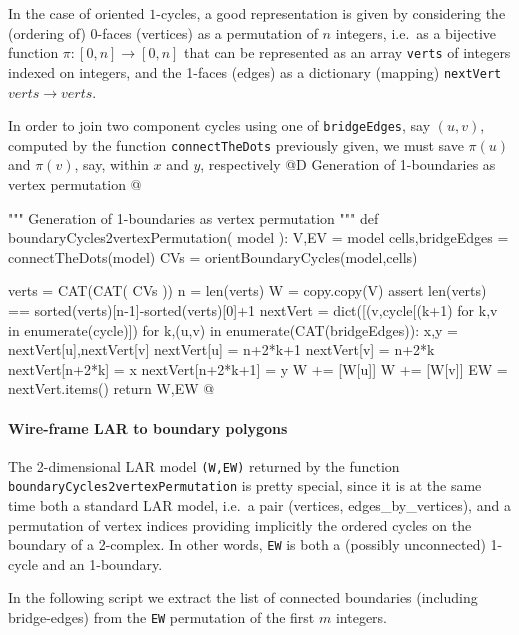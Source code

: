 \documentclass[11pt,oneside]{article}    %
\begin{document}
In the case of oriented $1$-cycles, a good representation is given by considering the (ordering of) 0-faces (vertices) as a permutation of $n$ integers, i.e.~as a bijective function $\pi :[0,n]\to[0,n]$ that can be represented as an array \texttt{verts} of integers indexed on integers, and the 1-faces (edges) as a dictionary (mapping) \texttt{nextVert} $verts\to verts$.

In order to join two component cycles using one of \texttt{bridgeEdges}, say $(u,v)$, computed by the function \texttt{connectTheDots} previously given, we must save $\pi(u)$ and $\pi(v)$, say, within $x$ and $y$, respectively
@D Generation of 1-boundaries as vertex permutation 
@{""" Generation of 1-boundaries as vertex permutation """
def boundaryCycles2vertexPermutation( model ):
    V,EV = model
    cells,bridgeEdges = connectTheDots(model)
    CVs = orientBoundaryCycles(model,cells)
    
    verts = CAT(CAT( CVs ))
    n = len(verts)
    W = copy.copy(V)
    assert len(verts) == sorted(verts)[n-1]-sorted(verts)[0]+1
    nextVert = dict([(v,cycle[(k+1)%
                   for k,v in enumerate(cycle)])
    for k,(u,v) in enumerate(CAT(bridgeEdges)):
        x,y = nextVert[u],nextVert[v]
        nextVert[u] = n+2*k+1
        nextVert[v] = n+2*k      
        nextVert[n+2*k] = x
        nextVert[n+2*k+1] = y
        W += [W[u]]
        W += [W[v]]
        EW = nextVert.items()
    return W,EW
@}

\paragraph{Wire-frame LAR to boundary polygons}
The 2-dimensional LAR model \texttt{(W,EW)} returned by the function \texttt{boundaryCycles2vertexPermutation} is pretty special, since it is at the same time both a standard LAR model, i.e.~a pair (vertices, edges\_by\_vertices), and a permutation of vertex indices providing implicitly the ordered cycles on the boundary of a 2-complex. In other words, \texttt{EW} is both a (possibly unconnected) 1-cycle and an 1-boundary.

In the following script we extract the list of connected boundaries (including bridge-edges) from the \texttt{EW} permutation of the first $m$ integers.
\end{document}
